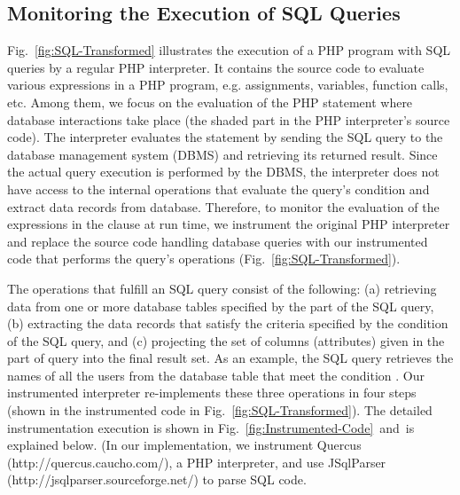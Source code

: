 \subsection{Monitoring the Execution of SQL Queries}



Fig.~\ref{fig:SQL-Transformed} illustrates the execution of a PHP
program with SQL queries by a regular PHP interpreter. It contains the
source code to evaluate various expressions in a PHP program, e.g.
assignments, variables, function calls, etc. Among them, we focus on
the evaluation of the PHP
 statement where database interactions take place
(the shaded part in the PHP interpreter's source code). The
interpreter evaluates the  statement by sending the
SQL query to the database management system (DBMS) and retrieving its
returned result. Since the actual query execution is performed by the
DBMS, the interpreter does not have access to the internal operations
that evaluate the query's  condition and extract data
records from database. Therefore, to monitor the evaluation of the
expressions in the
 clause at run time, we instrument the original PHP
interpreter and replace the source code handling database queries with
our instrumented code that performs the query's operations
(Fig.~\ref{fig:SQL-Transformed}).




The operations that fulfill an SQL  query consist of the
following: (a) retrieving data from one or more database tables
specified by the  part of the SQL query, (b) extracting
the data records that satisfy the criteria specified by the
 condition of the SQL query, and (c) projecting the set
of columns (attributes) given in the  part of query into
the final result set. As an example, the SQL query 
 retrieves the names of all the users from the
 database table that meet the condition . Our instrumented
interpreter re-implements these three operations in four steps (shown
in the instrumented code in Fig.~\ref{fig:SQL-Transformed}). The
detailed instrumentation execution is shown in
Fig.~\ref{fig:Instrumented-Code}~and~is explained below. (In our
implementation, we instrument Quercus (http://quercus.caucho.com/), a
PHP interpreter, and use JSqlParser
(http://jsqlparser.sourceforge.net/) to parse SQL code.

